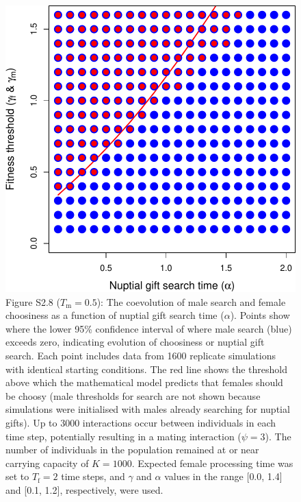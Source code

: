\documentclass[
]{article}
\begin{document}
\clearpage

\captionsetup{labelformat=empty}

\begin{figure}
\centering
\includegraphics{SI_files/figure-latex/unnamed-chunk-9-1.pdf}
\caption{Figure S2.8 (\(T_{\mathrm{m}} = 0.5\)): The coevolution of male
search and female choosiness as a function of nuptial gift search time
(\(\alpha\)). Points show where the lower 95\% confidence interval of
where male search (blue) exceeds zero, indicating evolution of
choosiness or nuptial gift search. Each point includes data from 1600
replicate simulations with identical starting conditions. The red line
shows the threshold above which the mathematical model predicts that
females should be choosy (male thresholds for search are not shown
because simulations were initialised with males already searching for
nuptial gifts). Up to 3000 interactions occur between individuals in
each time step, potentially resulting in a mating interaction
(\(\psi = 3\)). The number of individuals in the population remained at
or near carrying capacity of \(K = 1000\). Expected female processing
time was set to \(T_{\mathrm{f}}=2\) time steps, and \(\gamma\) and
\(\alpha\) values in the range {[}0.0, 1.4{]} and {[}0.1, 1.2{]},
respectively, were used.}
\end{figure}
\end{document}
